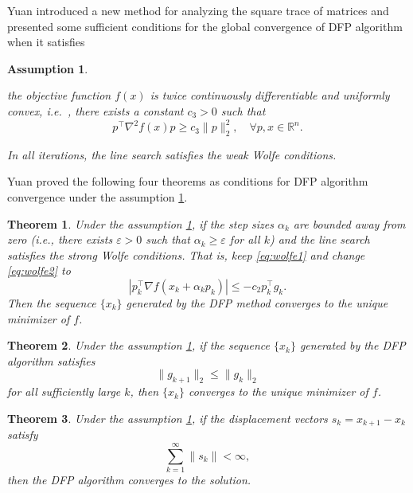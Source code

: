 \documentclass[12pt,a4paper]{article}  %
\newcounter{cite}
\newtheorem{theorem}{Theorem}[section]
\newtheorem{assumption}{Assumption}[section]
\theoremstyle{definition}
\numberwithin{equation}{section}
\begin{document}
Yuan\cite{Yuan1995convergence} introduced a new method for analyzing the square trace of matrices and presented some sufficient conditions for the global convergence of DFP algorithm when it satisfies

\begin{assumption}\label{assum}
	\item[(i)] the objective function $f(x)$ is twice continuously differentiable and uniformly convex, i.e.~, there exists a constant \(c_3 > 0\) such that
	\begin{equation}
		p^{\top}\nabla^2 f(x)p \ge c_3 \| p \|_2^2,\quad \forall p,x\in\mathbb{R}^n.
	\end{equation}
	\item[(ii)] In all iterations, the line search satisfies the weak Wolfe conditions. 
\end{assumption}  
Yuan proved the following four theorems as conditions for DFP algorithm convergence under the assumption \ref{assum}.
\begin{theorem}
	 Under the assumption \ref{assum}, if the step sizes \(\alpha_k\) are bounded away from zero (i.e., there exists \(\varepsilon > 0\) such that \(\alpha_k \ge \varepsilon\) for all \(k\)) and the line search satisfies the strong Wolfe conditions. That is, keep \eqref{eq:wolfe1} and change \eqref{eq:wolfe2} to
	\begin{equation}
	|p_k^{\top} \nabla f(x_k + \alpha_k p_k)| \le -c_2 p_k^{\top} g_k.
	\end{equation}
	Then the sequence \(\{x_k\}\) generated by the DFP method converges to the unique minimizer of \(f\).
\end{theorem}


\begin{theorem}
	 Under the assumption \ref{assum}, if the sequence \(\{x_k\}\) generated by the DFP algorithm satisfies \begin{equation}
	 	\|g_{k+1}\|_2 \le \|g_k\|_2
	 \end{equation} for all sufficiently large \(k\), then \(\{x_k\}\) converges to the unique minimizer of \(f\).
\end{theorem}


\begin{theorem}
	Under the assumption \ref{assum}, if the displacement vectors \(s_k = x_{k+1} - x_k\) satisfy
	\begin{equation}
	\sum_{k=1}^{\infty} \|s_k\| < \infty,
	\end{equation}
	then the DFP algorithm converges to the solution.
\end{theorem}
\end{document}
